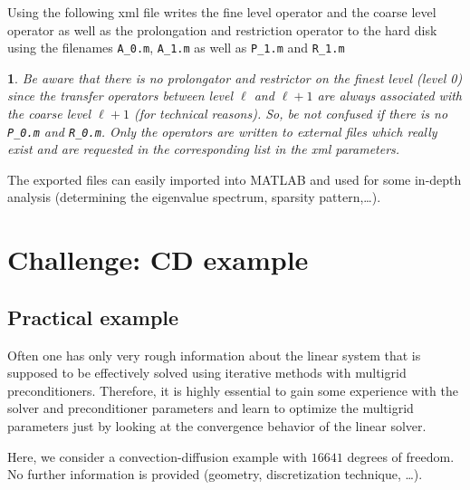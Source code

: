 \documentclass[10pt,fleqn]{book}
\newtheorem*{mycomment}{\ding{42}}
\begin{document}
Using the following xml file writes the fine level operator and the coarse level operator as well as the prolongation and restriction operator to the hard disk using the filenames \texttt{A\_0.m}, \texttt{A\_1.m} as well as \texttt{P\_1.m} and \texttt{R\_1.m}

\begin{mycomment}
Be aware that there is no prolongator and restrictor on the finest level (level 0) since the transfer operators between level $\ell$ and $\ell+1$ are always associated with the coarse level $\ell +1$ (for technical reasons). So, be not confused if there is no \texttt{P\_0.m} and \texttt{R\_0.m}. Only the operators are written to external files which really exist and are requested in the corresponding list in the xml parameters.
\end{mycomment}

The exported files can easily imported into MATLAB and used for some in-depth analysis (determining the eigenvalue spectrum, sparsity pattern,\ldots).

\chapter{Challenge: CD example}

\section{Practical example}

Often one has only very rough information about the linear system that is supposed to be effectively solved using iterative methods with multigrid preconditioners. Therefore, it is highly essential to gain some experience with the solver and preconditioner parameters and learn to optimize the multigrid parameters just by looking at the convergence behavior of the linear solver.

Here, we consider a convection-diffusion example with $16641$ degrees of freedom. No further information is provided (geometry, discretization technique, \ldots).
\end{document}
